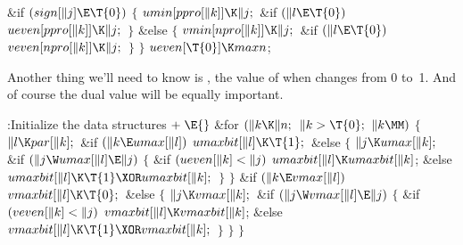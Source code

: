 \&{if} ${}(\\{sign}[\|j]\E\T{0}){}$\5
${}\{{}$\1\6
${}\\{umin}[\\{ppro}[\|k]]\K\|j;{}$\6
\&{if} ${}(\|l\E\T{0}){}$\1\5
${}\\{ueven}[\\{ppro}[\|k]]\K\|j;{}$\2\6
\4${}\}{}$\5
\2\&{else}\5
${}\{{}$\1\6
${}\\{vmin}[\\{npro}[\|k]]\K\|j;{}$\6
\&{if} ${}(\|l\E\T{0}){}$\1\5
${}\\{veven}[\\{npro}[\|k]]\K\|j;{}$\2\6
\4${}\}{}$\2\6
\4${}\}{}$\2\6
${}\\{ueven}[\T{0}]\K\\{maxn}{}$;\par
\fi

Another thing we'll need to know is ,
the value of
 when  changes from 0 to~1. And of
course
the dual value  will be equally important.

\Y\B\4:Initialize the data structures\X${}\mathrel+\E{}$\6
\&{for} ${}(\|k\K\|n;{}$ ${}\|k>\T{0};{}$ ${}\|k\MM){}$\5
${}\{{}$\1\6
${}\|l\K\\{par}[\|k];{}$\6
\&{if} ${}(\|k\E\\{umax}[\|l]){}$\1\5
${}\\{umaxbit}[\|l]\K\T{1};{}$\2\6
\&{else}\5
${}\{{}$\1\6
${}\|j\K\\{umax}[\|k];{}$\6
\&{if} ${}(\|j\W\\{umax}[\|l]\E\|j){}$\5
${}\{{}$\1\6
\&{if} ${}(\\{ueven}[\|k]<\|j){}$\1\5
${}\\{umaxbit}[\|l]\K\\{umaxbit}[\|k]{}$;\2\6
\&{else}\1\5
${}\\{umaxbit}[\|l]\K\T{1}\XOR\\{umaxbit}[\|k];{}$\2\6
\4${}\}{}$\2\6
\4${}\}{}$\2\6
\&{if} ${}(\|k\E\\{vmax}[\|l]){}$\1\5
${}\\{vmaxbit}[\|l]\K\T{0};{}$\2\6
\&{else}\5
${}\{{}$\1\6
${}\|j\K\\{vmax}[\|k];{}$\6
\&{if} ${}(\|j\W\\{vmax}[\|l]\E\|j){}$\5
${}\{{}$\1\6
\&{if} ${}(\\{veven}[\|k]<\|j){}$\1\5
${}\\{vmaxbit}[\|l]\K\\{vmaxbit}[\|k]{}$;\2\6
\&{else}\1\5
${}\\{vmaxbit}[\|l]\K\T{1}\XOR\\{vmaxbit}[\|k];{}$\2\6
\4${}\}{}$\2\6
\4${}\}{}$\2\6
\4${}\}{}$\2\par
\fi

